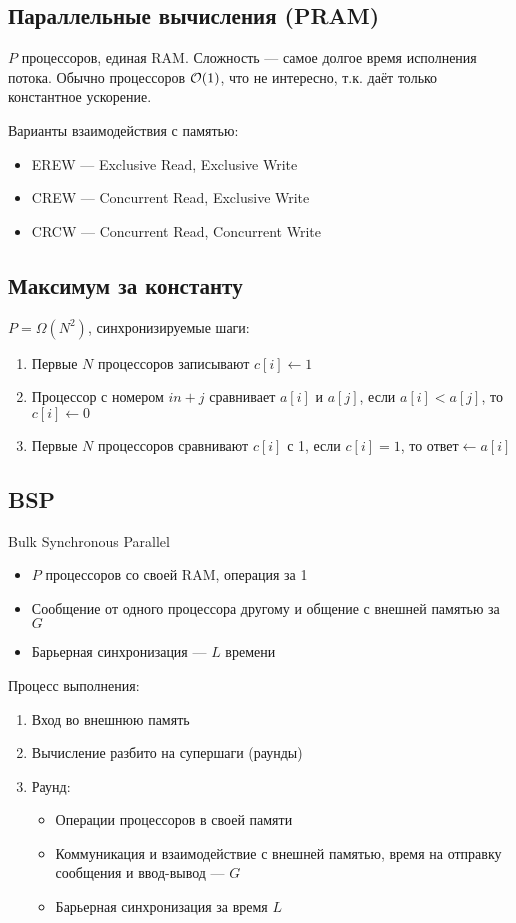 \subsection{Параллельные вычисления (PRAM)}
$P$ процессоров, единая RAM.
Сложность --- самое долгое время исполнения потока.
Обычно процессоров $\mathcal{O}(1)$, что не интересно,
т.к. даёт только константное ускорение.

Варианты взаимодействия с памятью:
\begin{itemize}
    \item EREW --- Exclusive Read, Exclusive Write
    \item CREW --- Concurrent Read, Exclusive Write
    \item CRCW --- Concurrent Read, Concurrent Write
\end{itemize}

\subsection{Максимум за константу}
$P = \Omega(N^2)$, синхронизируемые шаги:
\begin{enumerate}
    \item Первые $N$ процессоров записывают $c[i] \gets 1$
    \item Процессор с номером $in + j$ сравнивает $a[i]$ и $a[j]$,
    если $a[i] < a[j]$, то $c[i] \gets 0$
    \item Первые $N$ процессоров сравнивают $c[i]$ с 1,
    если $c[i] = 1$, то $\text{ответ} \gets a[i]$
\end{enumerate}

\subsection{BSP}
Bulk Synchronous Parallel
\begin{itemize}
    \item $P$ процессоров со своей RAM, операция за 1
    \item Сообщение от одного процессора другому и общение с внешней памятью за $G$
    \item Барьерная синхронизация --- $L$ времени
\end{itemize}

Процесс выполнения:
\begin{enumerate}
    \item Вход во внешнюю память
    \item Вычисление разбито на супершаги (раунды)
    \item Раунд:
    \begin{itemize}
        \item Операции процессоров в своей памяти
        \item Коммуникация и взаимодействие с внешней памятью,
        время на отправку сообщения и ввод-вывод --- $G$
        \item Барьерная синхронизация за время $L$
    \end{itemize}
\end{enumerate}

